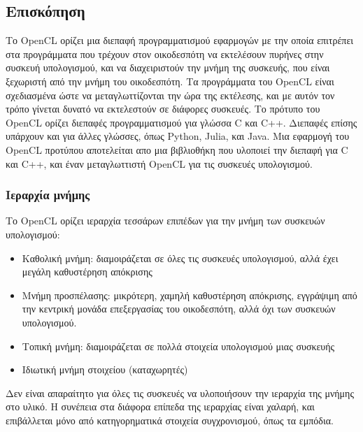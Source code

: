 \subsection{Επισκόπηση}
Το OpenCL ορίζει μια διεπαφή προγραμματισμού εφαρμογών με την οποία επιτρέπει στα προγράμματα που τρέχουν στον οικοδεσπότη να εκτελέσουν πυρήνες στην συσκευή υπολογισμού, και να διαχειριστούν την μνήμη της συσκευής, που είναι ξεχωριστή από την μνήμη του οικοδεσπότη. Τα προγράμματα του OpenCL είναι σχεδιασμένα ώστε να μεταγλωττίζονται την ώρα της εκτέλεσης, και με αυτόν τον τρόπο γίνεται δυνατό να εκτελεστούν σε διάφορες συσκευές. Το πρότυπο του OpenCL ορίζει διεπαφές προγραμματισμού για γλώσσα C και C++. Διεπαφές επίσης υπάρχουν και για άλλες γλώσσες, όπως Python, Julia, και Java. Μια εφαρμογή του OpenCL προτύπου αποτελείται απο μια βιβλιοθήκη που υλοποιεί την διεπαφή για C και C++, και έναν μεταγλωττιστή OpenCL για τις συσκευές υπολογισμού.\\
\subsubsection{Ιεραρχία μνήμης}
Το OpenCL ορίζει ιεραρχία τεσσάρων επιπέδων για την μνήμη των συσκευών υπολογισμού:
\begin{itemize}
\item Καθολική μνήμη: διαμοιράζεται σε όλες τις συσκευές υπολογισμού, αλλά έχει μεγάλη καθυστέρηση απόκρισης
\item Μνήμη προσπέλασης: μικρότερη, χαμηλή καθυστέρηση απόκρισης, εγγράψιμη από την κεντρική μονάδα επεξεργασίας του οικοδεσπότη, αλλά όχι των συσκευών υπολογισμού.
\item Τοπική μνήμη: διαμοιράζεται σε πολλά στοιχεία υπολογισμού μιας συσκευής
\item Ιδιωτική μνήμη στοιχείου (καταχωρητές) 
\end{itemize}   
Δεν είναι απαραίτητο για όλες τις συσκευές να υλοποιήσουν την ιεραρχία της μνήμης στο υλικό. Η συνέπεια στα διάφορα επίπεδα της ιεραρχίας είναι χαλαρή, και επιβάλλεται μόνο από κατηγορηματικά στοιχεία συγχρονισμού, όπως τα εμπόδια.
